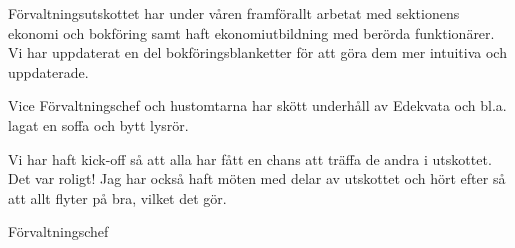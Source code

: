 \documentclass[../_main/handlingar.tex]{subfiles}
\begin{document}
Förvaltningsutskottet har under våren framförallt arbetat med sektionens ekonomi och bokföring samt haft ekonomiutbildning med berörda funktionärer. Vi har uppdaterat en del bokföringsblanketter för att göra dem mer intuitiva och uppdaterade.

Vice Förvaltningschef och hustomtarna har skött underhåll av Edekvata och bl.a. lagat en soffa och bytt lysrör.

Vi har haft kick-off så att alla har fått en chans att träffa de andra i utskottet. Det var roligt! Jag har också haft möten med delar av utskottet och hört efter så att allt flyter på bra, vilket det gör.


\begin{signatures}{1}
    \mvh
    \signature{Sophia Grimmeiss Grahm}{Förvaltningschef}
\end{signatures}
\end{document}
